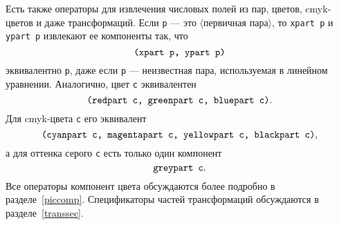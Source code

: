 \documentclass{article} %
\newcommand\invisgap{\nobreak\hskip0pt\relax}
\newcommand\tdescr[1]{$\langle$\invisgap#1\invisgap$\rangle$}
\begin{document}
Есть также операторы для извлечения числовых полей из пар, цветов, 
cmyk-цветов и даже трансформаций.
Если {\tt p} --- это \tdescr{первичная 
пара}, то {\tt xpart p}\label{Dxprt} и
{\tt ypart p}\label{Dyprt} извлекают ее компоненты 
так, что 
$$ \hbox{\tt (xpart p, ypart p)} $$ эквивалентно {\tt p}, даже если 
{\tt p} --- неизвестная пара, используемая в линейном уравнении.
Аналогично, цвет {\tt c} эквивалентен%
%
\label{Drgbprt}
$$ \hbox{\tt (redpart c, greenpart c, bluepart c)}. $$
Для cmyk-цвета {\tt c} его эквивалент%
%
%
\label{Dcmykprt}
$$ \hbox{\tt (cyanpart c, magentapart c, yellowpart c, blackpart c)}, $$ 
а для оттенка серого {\tt c} есть только один компонент 
\label{Dgreyprt}%
$$ \hbox{\tt greypart c}. $$
Все операторы компонент цвета обсуждаются более подробно в 
разделе~\ref{piccomp}. 
Спецификаторы частей трансформаций обсуждаются в разделе~\ref{transsec}.
\end{document}
